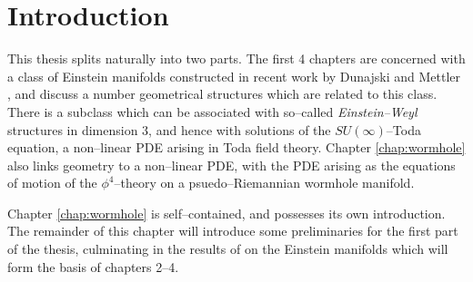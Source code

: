 

\chapter{Introduction}\label{chap:intro}


This thesis splits naturally into two parts. The first 4 chapters are concerned with a class of Einstein manifolds constructed in recent work by Dunajski and Mettler \cite{DM}, and discuss a number geometrical structures which are related to this class. There is a subclass which can be associated with so--called \textit{Einstein--Weyl} structures in dimension $3$, and hence with solutions of the $SU(\infty)$--Toda equation, a non--linear PDE arising in Toda field theory. Chapter \ref{chap:wormhole} also links geometry to a non--linear PDE, with the PDE arising as the equations of motion of the $\phi^4$--theory on a psuedo--Riemannian wormhole manifold.

Chapter \ref{chap:wormhole} is self--contained, and possesses its own introduction. The remainder of this chapter will introduce some preliminaries for the first part of the thesis, culminating in the results of \cite{DM} on the Einstein manifolds which will form the basis of chapters 2--4. 



